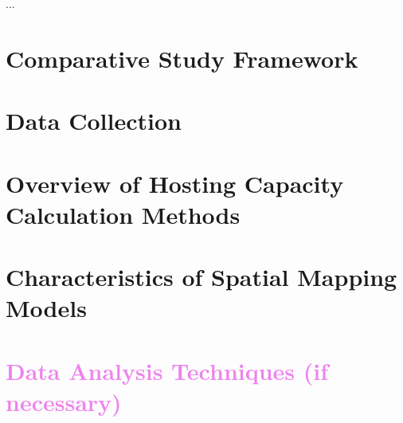 \cleardoublepage
\label{chap:3methodology}

...


\section{Comparative Study Framework}




\section{Data Collection}




\section{Overview of Hosting Capacity Calculation Methods}




\section{Characteristics of Spatial Mapping Models}




\section{\textcolor{violet}{Data Analysis Techniques (if necessary)}}

